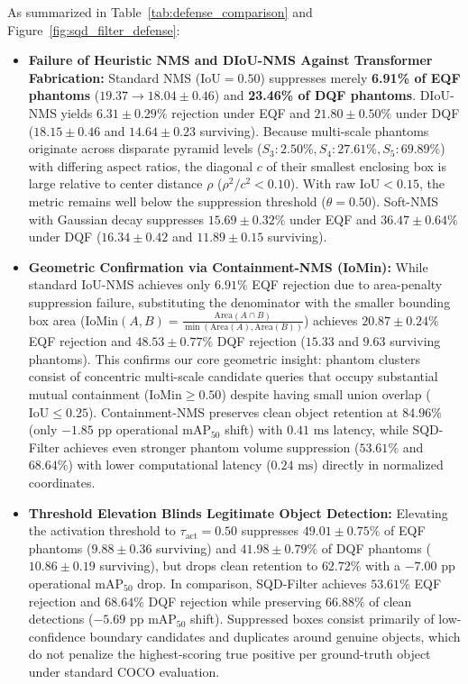 \documentclass[preprint,12pt]{elsarticle}
\begin{document}
As summarized in Table~\ref{tab:defense_comparison} and Figure~\ref{fig:sqd_filter_defense}:
\begin{itemize}
    \item \textbf{Failure of Heuristic NMS and DIoU-NMS Against Transformer Fabrication:} Standard NMS ($\mathrm{IoU}=0.50$) suppresses merely \textbf{6.91\% of EQF phantoms} ($19.37 \to 18.04 \pm 0.46$) and \textbf{23.46\% of DQF phantoms}. DIoU-NMS yields $6.31 \pm 0.29\%$ rejection under EQF and $21.80 \pm 0.50\%$ under DQF ($18.15 \pm 0.46$ and $14.64 \pm 0.23$ surviving). Because multi-scale phantoms originate across disparate pyramid levels ($S_3: 2.50\%, S_4: 27.61\%, S_5: 69.89\%$) with differing aspect ratios, the diagonal $c$ of their smallest enclosing box is large relative to center distance $\rho$ ($\rho^2/c^2 < 0.10$). With raw $\mathrm{IoU} < 0.15$, the metric remains well below the suppression threshold ($\theta=0.50$). Soft-NMS with Gaussian decay suppresses $15.69 \pm 0.32\%$ under EQF and $36.47 \pm 0.64\%$ under DQF ($16.34 \pm 0.42$ and $11.89 \pm 0.15$ surviving).
    \item \textbf{Geometric Confirmation via Containment-NMS (IoMin):} While standard IoU-NMS achieves only $6.91\%$ EQF rejection due to area-penalty suppression failure, substituting the denominator with the smaller bounding box area ($\mathrm{IoMin}(A, B) = \frac{\mathrm{Area}(A \cap B)}{\min(\mathrm{Area}(A), \mathrm{Area}(B))}$) achieves $\mathbf{20.87 \pm 0.24\%}$ EQF rejection and $\mathbf{48.53 \pm 0.77\%}$ DQF rejection ($15.33$ and $9.63$ surviving phantoms). This confirms our core geometric insight: phantom clusters consist of concentric multi-scale candidate queries that occupy substantial mutual containment ($\mathrm{IoMin} \ge 0.50$) despite having small union overlap ($\mathrm{IoU} \le 0.25$). Containment-NMS preserves clean object retention at $84.96\%$ (only $-1.85\text{ pp}$ operational $\mathrm{mAP}_{50}$ shift) with $0.41\text{ ms}$ latency, while SQD-Filter achieves even stronger phantom volume suppression ($53.61\%$ and $68.64\%$) with lower computational latency ($0.24\text{ ms}$) directly in normalized coordinates.
    \item \textbf{Threshold Elevation Blinds Legitimate Object Detection:} Elevating the activation threshold to $\tau_{\mathrm{act}} = 0.50$ suppresses $49.01 \pm 0.75\%$ of EQF phantoms ($9.88 \pm 0.36$ surviving) and $41.98 \pm 0.79\%$ of DQF phantoms ($10.86 \pm 0.19$ surviving), but drops clean retention to $62.72\%$ with a $-7.00\text{ pp}$ operational $\mathrm{mAP}_{50}$ drop. In comparison, SQD-Filter achieves $53.61\%$ EQF rejection and $68.64\%$ DQF rejection while preserving $66.88\%$ of clean detections ($-5.69\text{ pp}$ $\mathrm{mAP}_{50}$ shift). Suppressed boxes consist primarily of low-confidence boundary candidates and duplicates around genuine objects, which do not penalize the highest-scoring true positive per ground-truth object under standard COCO evaluation.

\end{itemize}
\end{document}
